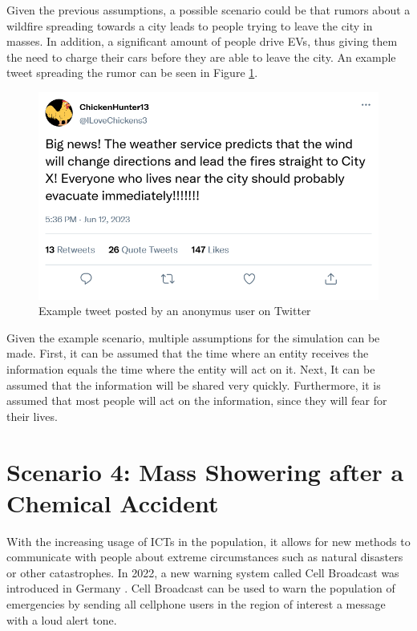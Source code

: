 Given the previous assumptions, a possible scenario could be that 
rumors about a wildfire spreading towards a city leads to people
trying to leave the city in masses. In addition, a significant 
amount of people drive EVs, thus giving them the need to charge
their cars before they are able to leave the city. An example
tweet spreading the rumor can be seen in Figure \ref{firetweet}.


\begin{figure}[!ht]
    \center
    \includegraphics[scale=.4]{figs/firenews.png}
    \caption{Example tweet posted by an anonymus user on Twitter}
    \label{firetweet}
\end{figure}

Given the example scenario, multiple assumptions for the simulation can
be made. First, it can be assumed that the time where an entity receives
the information equals the time where the entity will act on it.
Next, It can be assumed that the information will be shared very quickly.
Furthermore, it is assumed that most people will act on the information,
since they will fear for their lives.


\section{Scenario 4: Mass Showering after a Chemical Accident}

With the increasing usage of ICTs in the population, it allows for 
new methods to communicate with people about extreme circumstances
such as natural disasters or other catastrophes. In 2022,
a new warning system called Cell Broadcast was introduced in Germany
\cite{techrichtlinie}. Cell Broadcast can be used to warn the population
of emergencies by sending all cellphone users in the 
region of interest a message with a loud alert tone.

